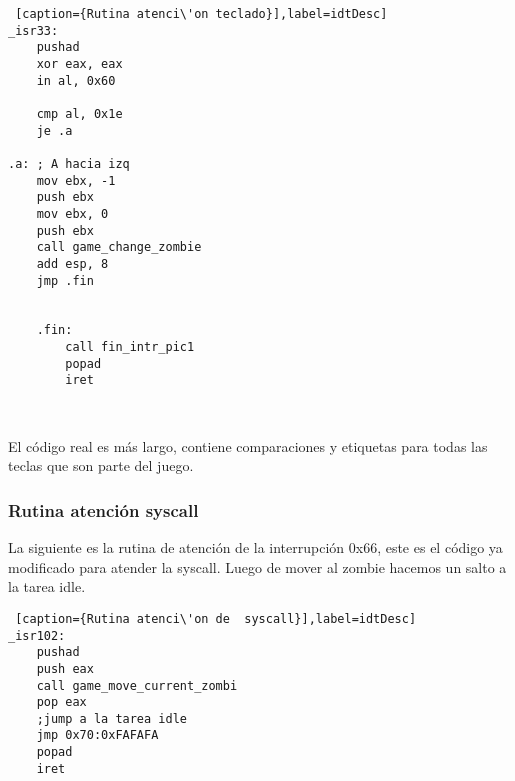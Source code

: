 \begin{lstlisting} [caption={Rutina atenci\'on teclado}],label=idtDesc] 
_isr33:
    pushad
    xor eax, eax
    in al, 0x60
    
    cmp al, 0x1e
    je .a

.a: ; A hacia izq
    mov ebx, -1
    push ebx
    mov ebx, 0
    push ebx
    call game_change_zombie
    add esp, 8
    jmp .fin


    .fin:
        call fin_intr_pic1
        popad
        iret
\end{lstlisting}

\\
\par{El c\'odigo real es m\'as largo, contiene comparaciones y etiquetas para todas las teclas que son parte del juego.}

\subsubsection*{Rutina atenci\'on syscall}
\par{La siguiente es la rutina de atenci\'on de la interrupci\'on 0x66, este es el c\'odigo ya modificado para atender la syscall. Luego de mover al zombie hacemos un salto a la tarea idle.}
\begin{lstlisting} [caption={Rutina atenci\'on de  syscall}],label=idtDesc] 
_isr102:
    pushad
    push eax
    call game_move_current_zombi
    pop eax
    ;jump a la tarea idle
    jmp 0x70:0xFAFAFA    
    popad
    iret

\end{lstlisting}
